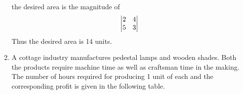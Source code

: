 \documentclass[journal,12pt,twocolumn]{IEEEtran}
\renewcommand\thesection{\arabic{section}}
\begin{document}
\begin{enumerate}[label=\thesection.\arabic*.,ref=\thesection.\theenumi]
    the desired area is  the magnitude of 
\begin{align}
 \begin{vmatrix}2 & 4\\5 & 3\end{vmatrix} 
    \end{align}
    Thus the desired area is 14 units.
\item A cottage industry manufactures pedestal lamps and wooden shades. Both the products require machine time as well as craftsman time in the making. The number of hours required for producing 1 unit of each and the corresponding profit is given in the following table. 
	\begin{table}[!ht]
		\centering
{}
	\caption{}
	\label{table}
\end{table}


\end{enumerate}
\end{document}

